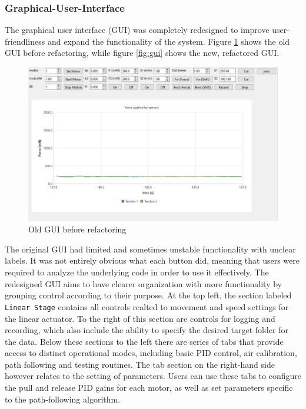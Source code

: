 \subsubsection{Graphical-User-Interface}
The graphical user interface (GUI) was completely redesigned to improve user-friendliness and expand the functionality of the system. Figure \ref{fig:oldgui} shows the old GUI before refactoring, while figure \ref{fig:gui} shows the new, refactored GUI.

\begin{figure}[H]
    \centering
    \includegraphics[width=0.95\linewidth]{images/gui/oldGUI.PNG}
    \caption{Old GUI before refactoring}
    \label{fig:oldgui}
\end{figure}
The original GUI had limited and sometimes unstable functionality with unclear labels. It was not entirely obvious what each button did, meaning that users were required to analyze the underlying code in order to use it effectively.
\newline \newline 
The redesigned GUI aims to have clearer organization with more functionality by grouping control according to their purpose. At the top left, the section labeled \texttt{Linear Stage} contains all controls realted to movement and speed settings for the linear actuator. To the right of this section are controls for logging and recording, which also include the ability to specify the desired target folder for the data.
\newline \newline
Below these sections to the left there are series of tabs that provide access to distinct operational modes, including basic PID control, air calibration, path following and testing routines. The tab section on the right-hand side however relates to the setting of parameters. Users can use these tabs to configure the pull and release PID gains for each motor, as well as set parameters specific to the path-following algorithm.

